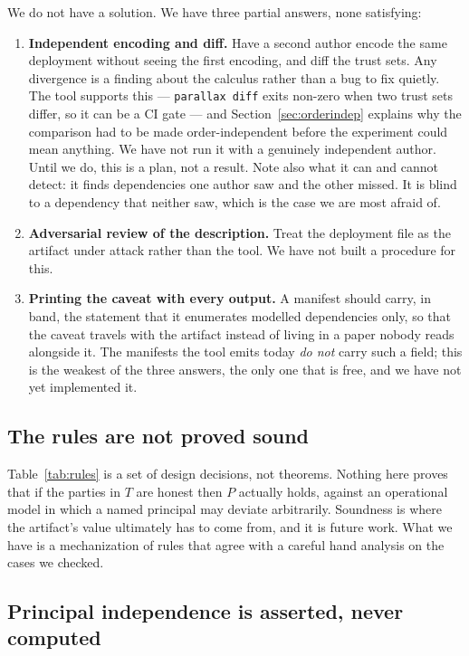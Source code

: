 \documentclass[11pt]{article}
\begin{document}
We do not have a solution. We have three partial answers, none satisfying:

\begin{enumerate}[itemsep=2pt,topsep=2pt]
\item \textbf{Independent encoding and diff.} Have a second author encode the
same deployment without seeing the first encoding, and diff the trust sets.
Any divergence is a finding about the calculus rather than a bug to fix
quietly. The tool supports this --- \texttt{parallax diff} exits non-zero
when two trust sets differ, so it can be a CI gate --- and
Section~\ref{sec:orderindep} explains why the comparison had to be made
order-independent before the experiment could mean anything. We have not run
it with a genuinely independent author. Until we do, this is a plan, not a
result. Note also what it can and cannot detect: it finds dependencies one
author saw and the other missed. It is blind to a dependency that neither
saw, which is the case we are most afraid of.
\item \textbf{Adversarial review of the description.} Treat the deployment
file as the artifact under attack rather than the tool. We have not built a
procedure for this.
\item \textbf{Printing the caveat with every output.} A manifest should carry,
in band, the statement that it enumerates modelled dependencies only, so that
the caveat travels with the artifact instead of living in a paper nobody
reads alongside it. The manifests the tool emits today \emph{do not} carry
such a field; this is the weakest of the three answers, the only one that is
free, and we have not yet implemented it.
\end{enumerate}

\subsection{The rules are not proved sound}

Table~\ref{tab:rules} is a set of design decisions, not theorems. Nothing here
proves that if the parties in $T$ are honest then $P$ actually holds, against
an operational model in which a named principal may deviate arbitrarily.
Soundness is where the artifact's value ultimately has to come from, and it is
future work. What we have is a mechanization of rules that agree with a
careful hand analysis on the cases we checked.

\subsection{Principal independence is asserted, never computed}
\end{document}
